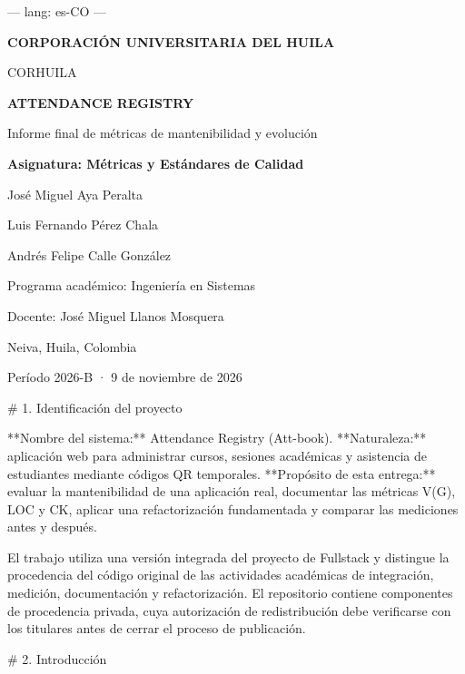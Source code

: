 ---
lang: es-CO
---

\begin{titlepage}
\centering
\vspace*{2.2cm}
{\Large\bfseries CORPORACIÓN UNIVERSITARIA DEL HUILA\par}
{\large CORHUILA\par}
\vspace{2.6cm}
{\Huge\bfseries ATTENDANCE REGISTRY\par}
\vspace{0.4cm}
{\Large Informe final de métricas de mantenibilidad y evolución\par}
\vspace{1.5cm}
{\large\bfseries Asignatura: Métricas y Estándares de Calidad\par}
\vspace{1.0cm}
{\large José Miguel Aya Peralta\par}
{\large Luis Fernando Pérez Chala\par}
{\large Andrés Felipe Calle González\par}
\vfill
{\normalsize Programa académico: Ingeniería en Sistemas\par}
{\normalsize Docente: José Miguel Llanos Mosquera\par}
{\normalsize Neiva, Huila, Colombia\par}
{\normalsize Período 2026-B · 9 de noviembre de 2026\par}
\end{titlepage}

\tableofcontents
\newpage

# 1. Identificación del proyecto

**Nombre del sistema:** Attendance Registry (Att-book). **Naturaleza:** aplicación web para administrar cursos, sesiones académicas y asistencia de estudiantes mediante códigos QR temporales. **Propósito de esta entrega:** evaluar la mantenibilidad de una aplicación real, documentar las métricas V(G), LOC y CK, aplicar una refactorización fundamentada y comparar las mediciones antes y después.

El trabajo utiliza una versión integrada del proyecto de Fullstack y distingue la procedencia del código original de las actividades académicas de integración, medición, documentación y refactorización. El repositorio contiene componentes de procedencia privada, cuya autorización de redistribución debe verificarse con los titulares antes de cerrar el proceso de publicación.

# 2. Introducción

